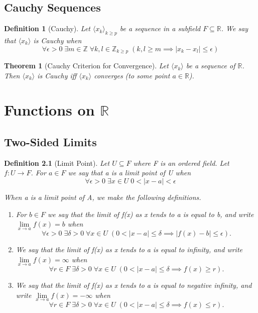 \documentclass[11pt, oneside]{book}
\theoremstyle{break}
\newtheorem{thm}{Theorem}[section]
\newtheorem{defn}{Definition}[section]
\newcommand{\bb}[1]{\mathbb{#1}}		%
\begin{document}
\section{Cauchy Sequences}

\begin{defn}[Cauchy]
	Let $\langle x_k \rangle_{k \geq p}$ be a sequence in a subfield $F \subseteq \bb{R}$. We say that $\langle x_k \rangle$ is Cauchy when
	\[
		\forall \epsilon > 0 \; \exists m \in \bb{Z} \; \forall k, l \in \bb{Z}_{k \geq p}\; (k, l \geq m \implies |x_k - x_l| \leq \epsilon)
	\]
\end{defn}

\begin{thm}[Cauchy Criterion for Convergence]\label{CauchyCriterion_Seq}
	Let $\langle x_k \rangle$ be a sequence of $\bb{R}$. Then $\langle x_k \rangle$ is Cauchy iff $\langle x_k \rangle$ converges (to some point $a \in \bb{R}$).
\end{thm}


\chapter{Functions on \texorpdfstring{$\bb{R}$}{R}}


\section{Two-Sided Limits}

\begin{defn}[Limit Point]
	Let $U \subseteq F$ where F is an ordered field. Let $f: U \to F$. For $a \in F$ we say that a is a limit point of U when
	\[
		\forall \epsilon > 0 \; \exists x \in U \; 0 < |x - a| < \epsilon
	\]

	When a is a limit point of A, we make the following definitions.
	\begin{enumerate}
		\item For $b \in F$ we say that the limit of f(x) as x tends to a is equal to b, and write $\lim\limits_{x \to a} f(x) = b$ when
			\[
				\forall \epsilon > 0 \; \exists \delta > 0 \; \forall x \in U \; (0 < |x - a| \leq \delta \implies |f(x) - b| \leq \epsilon).
			\]
		\item We say that the limit of f(x) as x tends to a is equal to infinity, and write $\lim\limits_{x \to a} f(x) = \infty$ when
			\[
				\forall r \in F \; \exists \delta > 0 \; \forall x \in U \; (0 < |x - a| \leq \delta \implies f(x) \geq r).
			\]
		\item We say that the limit of f(x) as x tends to a is equal to negative infinity, and write $\lim\limits_{x \to a}f(x) = -\infty$ when
			\[
				\forall r \in F \; \exists \delta > 0 \; \forall x \in U \; (0 < |x - a| \leq \delta \implies f(x) \leq r).
			\]
	\end{enumerate}
\end{defn}
\end{document}
